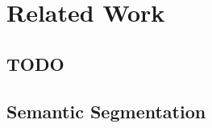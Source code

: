 
\section{Related Work}
\label{sec:related_work}

\subsection{TODO}
\label{ssec:sota_vin}

\subsection{Semantic Segmentation}
\label{ssec:sota_semantic_segmentation}